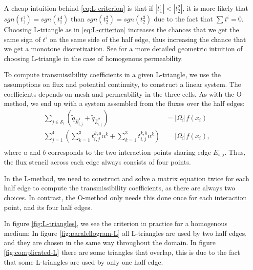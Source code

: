 \documentclass[../Main/main.tex]{subfiles}
\begin{document}
	A cheap intuition behind \eqref{eq:L-criterion} is that if $|t_1^1|<|t_2^2|$, it is more likely that $sgn(t_1^1) = sgn(t_1^4)$ than $sgn(t_2^2) = sgn(t_2^3)$ due to the fact that $\sum t^i = 0$. Choosing L-triangle as in \eqref{eq:L-criterion} increases the chances that we get the same sign of $t^i$ on the same side of the half edge, thus increasing the chance that we get a monotone discretization.  See \cite{https://doi.org/10.1002/fld.1926} for a more detailed geometric intuition of choosing L-triangle in the case of homogenous permeability. 
	\par 
	To compute transmissibility coefficients in a given L-triangle, we use the assumptions on flux and potential continuity, to construct a linear system. The coefficients depends on mesh and permeability in the three cells. 
		As with the O-method, we end up with a system assembled from the fluxes over the half edges:
	\begin{equation}
		\begin{aligned}
			\sum_{j\in \mathcal{S}_i} (\tilde{q}_{\hat{E}_{i,j}^1} + \tilde{q}_{\hat{E}_{i,j}^2}) &= |\Omega_i|f(x_i) \\
			\sum_{j=1}^4 (\sum_{k=1}^3 t^{k,a}_{i,j}u^k + \sum_{k=1}^3 t^{k,b}_{i,j}u^k)&= |\Omega_i|f(x_i),\\
		\end{aligned}
	\end{equation}
	where $a$ and $b$ corresponds to the two interaction points sharing edge $E_{i,j}$. Thus, the flux stencil across each edge always consists of four points.
	\begin{remark}
		In the L-method, we need to construct and solve a matrix equation twice for each half edge to compute the transmissibility coefficients, as there are always two choices. In contrast, the O-method only needs this done once for each interaction point, and its four half edges.
	\end{remark}
	\par
	In figure \ref{fig:L-triangles}, we see the criterion in practice for a homogenous medium: In figure \ref{fig:paralellogram-L} all L-triangles are used by two half edges, and they are chosen in the same way throughout the domain. In figure \ref{fig:complicated-L} there are some triangles that overlap, this is due to the fact that some L-triangles are used by only one half edge.
\end{document}
